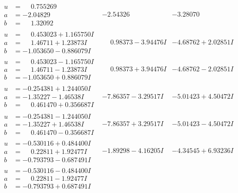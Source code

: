 \documentclass[1p]{elsarticle_modified}
\theoremstyle{definition}
\begin{document}
$$\begin{array}{c|c|c}
\begin{aligned}
u &= \phantom{-}0.755269\phantom{ +0.000000I} \\
a &= -2.04829\phantom{ +0.000000I} \\
b &= \phantom{-}1.32092\phantom{ +0.000000I}\end{aligned}
 & -2.54326\phantom{ +0.000000I} & -3.28070\phantom{ +0.000000I} \\ \hline\begin{aligned}
u &= \phantom{-}0.453023 + 1.165750 I \\
a &= \phantom{-}1.46711 + 1.23873 I \\
b &= -1.053650 - 0.886079 I\end{aligned}
 & \phantom{-}0.98373 - 3.94476 I & -4.68762 + 2.02851 I \\ \hline\begin{aligned}
u &= \phantom{-}0.453023 - 1.165750 I \\
a &= \phantom{-}1.46711 - 1.23873 I \\
b &= -1.053650 + 0.886079 I\end{aligned}
 & \phantom{-}0.98373 + 3.94476 I & -4.68762 - 2.02851 I \\ \hline\begin{aligned}
u &= -0.254381 + 1.244050 I \\
a &= -1.35227 - 1.46538 I \\
b &= \phantom{-}0.461470 + 0.356687 I\end{aligned}
 & -7.86357 - 3.29517 I & -5.01423 + 4.50472 I \\ \hline\begin{aligned}
u &= -0.254381 - 1.244050 I \\
a &= -1.35227 + 1.46538 I \\
b &= \phantom{-}0.461470 - 0.356687 I\end{aligned}
 & -7.86357 + 3.29517 I & -5.01423 - 4.50472 I \\ \hline\begin{aligned}
u &= -0.530116 + 0.484400 I \\
a &= \phantom{-}0.22811 + 1.92477 I \\
b &= -0.793793 - 0.687491 I\end{aligned}
 & -1.89298 - 4.16205 I & -4.34545 + 6.93236 I \\ \hline\begin{aligned}
u &= -0.530116 - 0.484400 I \\
a &= \phantom{-}0.22811 - 1.92477 I \\
b &= -0.793793 + 0.687491 I\end{aligned}

\end{array}$$
\end{document}
